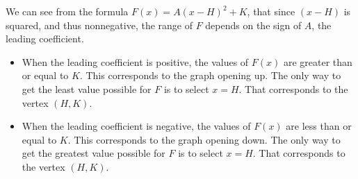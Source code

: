 \documentclass{ximera}
\begin{document}
\begin{image}
\end{image}

 









We can see from the formula $F(x) = A (x - H)^2 + K$, that since $(x - H)$ is squared, and thus nonnegative, the range of $F$ depends on the sign of $A$, the leading coefficient. 


\begin{itemize}
     \item When the leading coefficient is positive, the values of $F(x)$ are greater than or equal to $K$. This corresponds to the graph opening up.  The only way to get the least value possible for $F$ is to select $x = H$. That corresponds to the vertex $(H, K)$. 


     \item When the leading coefficient is negative, the values of $F(x)$ are less than or equal to $K$. This corresponds to the graph opening down.  The only way to get the greatest value possible for $F$ is to select $x = H$. That corresponds to the vertex $(H, K)$.  
\end{itemize}
\end{document}
